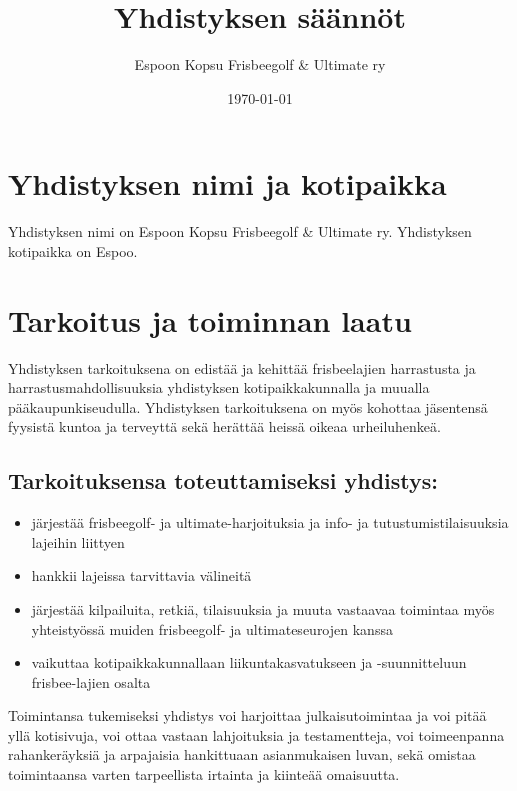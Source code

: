 \documentclass[a4paper, 12pt, finnish]{scrartcl}
\title{Yhdistyksen säännöt}
\author{Espoon Kopsu Frisbeegolf \& Ultimate ry}
\date{\today}
\begin{document}
\maketitle
\newpage

\tableofcontents
\newpage

\section{Yhdistyksen nimi ja kotipaikka}
Yhdistyksen nimi on Espoon Kopsu Frisbeegolf \& Ultimate ry.
Yhdistyksen kotipaikka on Espoo.

\section{Tarkoitus ja toiminnan laatu}
Yhdistyksen tarkoituksena on edistää ja kehittää frisbeelajien harrastusta ja harrastusmahdollisuuksia yhdistyksen kotipaikkakunnalla ja muualla pääkaupunkiseudulla.
Yhdistyksen tarkoituksena on myös kohottaa jäsentensä fyysistä kuntoa ja terveyttä sekä herättää heissä oikeaa urheiluhenkeä.

\subsection*{Tarkoituksensa toteuttamiseksi yhdistys:}
\begin{itemize}
  \item järjestää frisbeegolf- ja ultimate-harjoituksia ja info- ja tutustumistilaisuuksia lajeihin liittyen
  \item hankkii lajeissa tarvittavia välineitä
  \item järjestää kilpailuita, retkiä, tilaisuuksia ja muuta vastaavaa toimintaa myös yhteistyössä muiden frisbeegolf- ja ultimateseurojen kanssa
  \item vaikuttaa kotipaikkakunnallaan liikuntakasvatukseen ja -suunnitteluun frisbee-lajien osalta
\end{itemize}

Toimintansa tukemiseksi yhdistys voi harjoittaa julkaisutoimintaa ja voi pitää yllä kotisivuja,
voi ottaa vastaan lahjoituksia ja testamentteja,
voi toimeenpanna rahankeräyksiä ja arpajaisia hankittuaan asianmukaisen luvan, sekä omistaa toimintaansa varten tarpeellista irtainta ja kiinteää omaisuutta.
\end{document}

